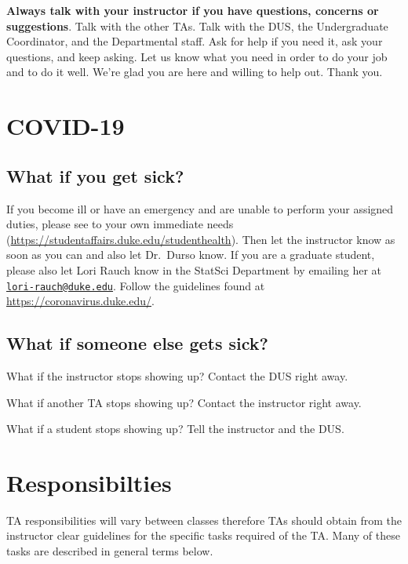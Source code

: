 \documentclass[
]{article}
\begin{document}
\textbf{Always talk with your instructor if you have questions, concerns or suggestions}. Talk with the other TAs. Talk with the DUS, the Undergraduate Coordinator, and the Departmental staff. Ask for help if you need it, ask your questions, and keep asking. Let us know what you need in order to do your job and to do it well. We're glad you are here and willing to help out. Thank you.

\hypertarget{covid-19}{%
\section{COVID-19}\label{covid-19}}

\hypertarget{what-if-you-get-sick}{%
\subsection{What if you get sick?}\label{what-if-you-get-sick}}

If you become ill or have an emergency and are unable to perform your assigned duties, please see to your own immediate needs (\url{https://studentaffairs.duke.edu/studenthealth}). Then let the instructor know as soon as you can and also let Dr.~Durso know. If you are a graduate student, please also let Lori Rauch know in the StatSci Department by emailing her at \href{mailto:lori-rauch@duke.edu}{\nolinkurl{lori-rauch@duke.edu}}. Follow the guidelines found at \url{https://coronavirus.duke.edu/}.

\hypertarget{what-if-someone-else-gets-sick}{%
\subsection{What if someone else gets sick?}\label{what-if-someone-else-gets-sick}}

What if the instructor stops showing up? Contact the DUS right away.

What if another TA stops showing up? Contact the instructor right away.

What if a student stops showing up? Tell the instructor and the DUS.

\hypertarget{responsibilties}{%
\section{Responsibilties}\label{responsibilties}}

TA responsibilities will vary between classes therefore TAs should obtain from the instructor clear guidelines for the specific tasks required of the TA. Many of these tasks are described in general terms below.
\end{document}
